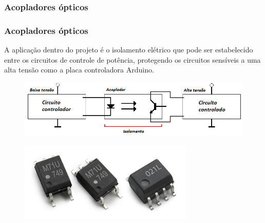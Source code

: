 \subsubsection{Acopladores ópticos}

\begin{frame}
\frametitle{Acopladores ópticos}

A aplicação dentro do projeto é o isolamento elétrico que pode ser estabelecido entre os circuitos de controle de potência, protegendo os circuitos sensíveis a uma alta tensão como a placa controladora Arduino.

\begin{figure}
\centering
\includegraphics[scale = 0.5]{figs/acoplador}
\end{figure}

\begin{figure}
\centering
\includegraphics[scale = 0.7]{figs/fotoacoplador}
\end{figure}

\end{frame}
